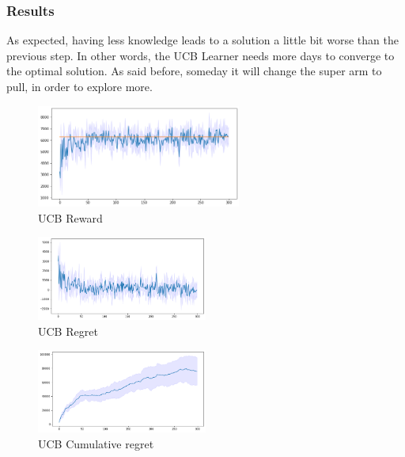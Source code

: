 \subsubsection{Results}
As expected, having less knowledge leads to a solution a little bit worse than the previous step. In other words, the UCB Learner needs more days to converge to the optimal solution. As said before, someday it will change the super arm to pull, in order to explore more.
\begin{figure}[ht]
    \begin{center}
    \includegraphics[width=0.6\textwidth]{img/UCB4.png}
    \caption{UCB Reward}
    \label{fig:reward41}
    \end{center}
\end{figure}
\begin{multicols}{2}
    \begin{figure}[H]
        \begin{center}
        \includegraphics[width=0.5\textwidth]{img/UCB4_regret.png}
        \caption{UCB Regret}
        \label{fig:regret41}
        \end{center}
    \end{figure}
    \columnbreak
    \begin{figure}[H]
        \begin{center}
        \includegraphics[width=0.5\textwidth]{img/UCB4_cum_reg.png}
        \caption{UCB Cumulative regret}
        \label{fig:cum_reg41}
        \end{center}
    \end{figure}
\end{multicols}


